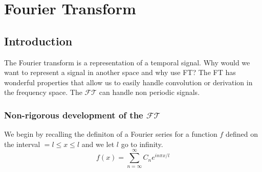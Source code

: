\chapter{Fourier Transform} 
\section{Introduction}
\label{sec:Introduction}
The Fourier transform is a representation of a temporal signal. Why would we want to
represent a signal in another space and why use FT? The FT has wonderful properties that
allow us to easily handle convolution or derivation in the frequency space. The $
\mathscr{ FT } $ can handle non periodic signals.

\subsection{Non-rigorous development of the $ \mathscr{ FT }  $}
\label{subsec:Non-rigorous development of the $ \mathscr{ FT }  $}
We begin by recalling the definiton of a Fourier series for a function $ f $ defined on
the interval $ =l \leq x \leq l $ and we let $ l $ go to infinity. 
\begin{equation}
f(x) = \sum_{n=\infty}^{\infty} C_n e^{ in\pi x / l} 
\label{eq:fs_rep}
\end{equation}


